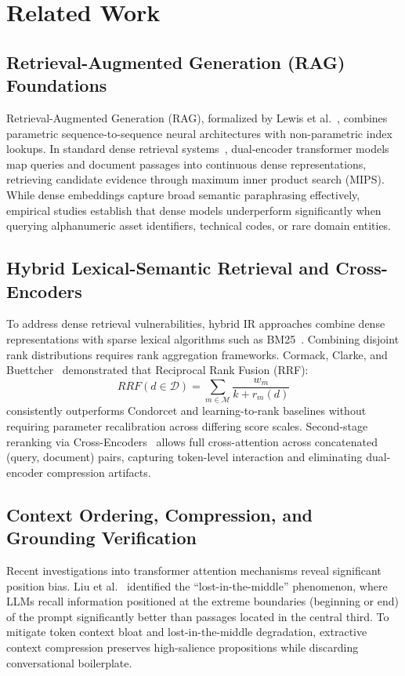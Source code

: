 \section{Related Work}
\label{sec:related_work}

\subsection{Retrieval-Augmented Generation (RAG) Foundations}
Retrieval-Augmented Generation (RAG), formalized by Lewis et al.~\cite{lewis2020retrieval}, combines parametric sequence-to-sequence neural architectures with non-parametric index lookups. In standard dense retrieval systems~\cite{karpukhin2020dense}, dual-encoder transformer models map queries and document passages into continuous dense representations, retrieving candidate evidence through maximum inner product search (MIPS). While dense embeddings capture broad semantic paraphrasing effectively, empirical studies establish that dense models underperform significantly when querying alphanumeric asset identifiers, technical codes, or rare domain entities.

\subsection{Hybrid Lexical-Semantic Retrieval and Cross-Encoders}
To address dense retrieval vulnerabilities, hybrid IR approaches combine dense representations with sparse lexical algorithms such as BM25~\cite{robertson2009probabilistic}. Combining disjoint rank distributions requires rank aggregation frameworks. Cormack, Clarke, and Buettcher~\cite{cormack2009reciprocal} demonstrated that Reciprocal Rank Fusion (RRF):
\begin{equation}
\label{eq:rrf}
RRF(d \in \mathcal{D}) = \sum_{m \in \mathcal{M}} \frac{w_m}{k + r_m(d)}
\end{equation}
consistently outperforms Condorcet and learning-to-rank baselines without requiring parameter recalibration across differing score scales. Second-stage reranking via Cross-Encoders~\cite{nogueira2019passage} allows full cross-attention across concatenated (query, document) pairs, capturing token-level interaction and eliminating dual-encoder compression artifacts.

\subsection{Context Ordering, Compression, and Grounding Verification}
Recent investigations into transformer attention mechanisms reveal significant position bias. Liu et al.~\cite{liu2024lost} identified the ``lost-in-the-middle'' phenomenon, where LLMs recall information positioned at the extreme boundaries (beginning or end) of the prompt significantly better than passages located in the central third. To mitigate token context bloat and lost-in-the-middle degradation, extractive context compression preserves high-salience propositions while discarding conversational boilerplate.

